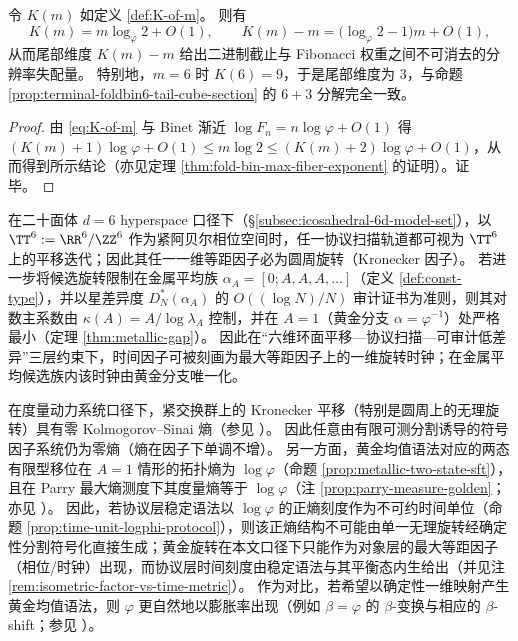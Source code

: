 \begin{corollary}\label{cor:terminal-Km-depth-rescaling}
令 \(K(m)\) 如定义 \ref{def:K-of-m}。
则有
\[
K(m)=m\log_{\varphi}2+O(1),
\qquad
K(m)-m=\bigl(\log_{\varphi}2-1\bigr)m+O(1),
\]
从而尾部维度 \(K(m)-m\) 给出二进制截止与 Fibonacci 权重之间不可消去的分辨率失配量。
特别地，\(m=6\) 时 \(K(6)=9\)，于是尾部维度为 \(3\)，与命题 \ref{prop:terminal-foldbin6-tail-cube-section} 的 \(6{+}3\) 分解完全一致。
\end{corollary}
\begin{proof}
由 \eqref{eq:K-of-m} 与 Binet 渐近 \(\log F_n=n\log\varphi+O(1)\) 得
\(
(K(m)+1)\log\varphi+O(1)\le m\log 2\le (K(m)+2)\log\varphi+O(1)
\)，从而得到所示结论（亦见定理 \ref{thm:fold-bin-max-fiber-exponent} 的证明）。证毕。
\end{proof}

\begin{corollary}[六维环面平移的规范一维时间因子与金属平均族唯一化]\label{cor:terminal-time-factor-metallic-unique}
在二十面体 \(d=6\) hyperspace 口径下（\S\ref{subsec:icosahedral-6d-model-set}），以
\(
\TT^6:=\RR^6/\ZZ^6
\)
作为紧阿贝尔相位空间时，任一协议扫描轨道都可视为 \(\TT^6\) 上的平移迭代；因此其任一一维等距因子必为圆周旋转（Kronecker 因子）。
若进一步将候选旋转限制在金属平均族 \(\alpha_A=[0;A,A,A,\dots]\)（定义 \ref{def:const-type}），并以星差异度 \(D_N^\ast(\alpha_A)\) 的 \(O((\log N)/N)\) 审计证书为准则，则其对数主系数由
\(
\kappa(A)=A/\log\lambda_A
\)
控制，并在 \(A=1\)（黄金分支 \(\alpha=\varphi^{-1}\)）处严格最小（定理 \ref{thm:metallic-gap}）。
因此在“六维环面平移—协议扫描—可审计低差异”三层约束下，时间因子可被刻画为最大等距因子上的一维旋转时钟；在金属平均候选族内该时钟由黄金分支唯一化。
\end{corollary}

\begin{remark}\label{rem:terminal-rotation-entropy-obstruction}
在度量动力系统口径下，紧交换群上的 Kronecker 平移（特别是圆周上的无理旋转）具有零 Kolmogorov--Sinai 熵（参见 \cite{WaltersErgodicTheory}）。
因此任意由有限可测分割诱导的符号因子系统仍为零熵（熵在因子下单调不增）。
另一方面，黄金均值语法对应的两态有限型移位在 \(A=1\) 情形的拓扑熵为 \(\log\varphi\)（命题 \ref{prop:metallic-two-state-sft}），且在 Parry 最大熵测度下其度量熵等于 \(\log\varphi\)（注 \ref{prop:parry-measure-golden}；亦见 \cite{LindMarcus1995}）。
因此，若协议层稳定语法以 \(\log\varphi\) 的正熵刻度作为不可约时间单位（命题 \ref{prop:time-unit-logphi-protocol}），则该正熵结构不可能由单一无理旋转经确定性分割符号化直接生成；黄金旋转在本文口径下只能作为对象层的最大等距因子（相位/时钟）出现，而协议层时间刻度由稳定语法与其平衡态内生给出（并见注 \ref{rem:isometric-factor-vs-time-metric}）。
作为对比，若希望以确定性一维映射产生黄金均值语法，则 \(\varphi\) 更自然地以膨胀率出现（例如 \(\beta=\varphi\) 的 \(\beta\)-变换与相应的 \(\beta\)-shift；参见 \cite{LindMarcus1995}）。
\end{remark}

